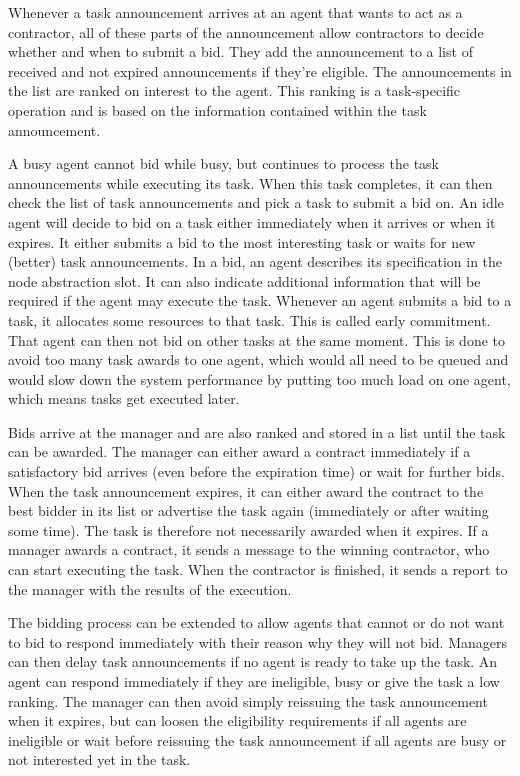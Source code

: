 \documentclass[10pt,a4paper,twocolumn]{article}
\begin{document}
Whenever a task announcement arrives at an agent that wants to act as a contractor, all of these parts of the announcement allow contractors to decide whether and when to submit a bid. They add the announcement to a list of received and not expired announcements if they're eligible. The announcements in the list are ranked on interest to the agent. This ranking is a task-specific operation and is based on the information contained within the task announcement.

A busy agent cannot bid while busy, but continues to process the task announcements while executing its task. When this task completes, it can then check the list of task announcements and pick a task to submit a bid on. An idle agent will decide to bid on a task either immediately when it arrives or when it expires. It either submits a bid to the most interesting task or waits for new (better) task announcements. In a bid, an agent describes its specification in the node abstraction slot. It can also indicate additional information that will be required if the agent may execute the task. Whenever an agent submits a bid to a task, it allocates some resources to that task. This is called early commitment. That agent can then not bid on other tasks at the same moment. This is done to avoid too many task awards to one agent, which would all need to be queued and would slow down the system performance by putting too much load on one agent, which means tasks get executed later.

Bids arrive at the manager and are also ranked and stored in a list until the task can be awarded. The manager can either award a contract immediately if a satisfactory bid arrives (even before the expiration time) or wait for further bids. When the task announcement expires, it can either award the contract to the best bidder in its list or advertise the task again (immediately or after waiting some time). The task is therefore not necessarily awarded when it expires. If a manager awards a contract, it sends a message to the winning contractor, who can start executing the task. When the contractor is finished, it sends a report to the manager with the results of the execution.

The bidding process can be extended to allow agents that cannot or do not want to bid to respond immediately with their reason why they will not bid. Managers can then delay task announcements if no agent is ready to take up the task. An agent can respond immediately if they are ineligible, busy or give the task a low ranking. The manager can then avoid simply reissuing the task announcement when it expires, but can loosen the eligibility requirements if all agents are ineligible or wait before reissuing the task announcement if all agents are busy or not interested yet in the task.
\end{document}
